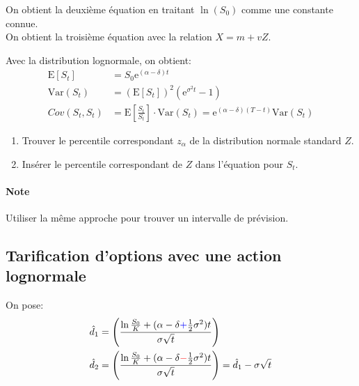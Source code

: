 \documentclass[10pt, french]{article}
\begin{document}
\begin{multicols*}{2}
\begin{definitionNOHFILL}[Distribution]
\tcbline

On obtient la deuxième équation en traitant $\ln(S_{0})$ comme une constante connue.\\
On obtient la troisième équation avec la relation $X = m + vZ$.
\end{definitionNOHFILL}

\begin{definitionNOHFILLsub}
Avec la distribution lognormale, on obtient:
\begin{align*}
	\text{E}[S_{t}]
	&=	S_{0}\textrm{e}^{(\alpha - \delta)t}	\\
	\text{Var}(S_{t})
	&=	\left(\text{E}[S_{t}]\right)^{2} \left(\textrm{e}^{\sigma^{2}t} - 1\right)	\\
	Cov(S_{t}, S_{t})
	&=	\text{E}\left[\frac{S_{t}}{S_{t}}\right] \cdot \text{Var}(S_{t})	
	=	\textrm{e}^{(\alpha - \delta)(T - t)} \text{Var}(S_{t})
\end{align*}
\end{definitionNOHFILLsub}

\begin{distributions}
\begin{enumerate}[leftmargin = *]
	\item	Trouver le percentile correspondant $z_{\alpha}$ de la distribution normale standard $Z$.
	\item	Insérer le percentile correspondant de $Z$ dans l'équation pour $S_{t}$.
\end{enumerate}
\tcbline
\paragraph{Note}	Utiliser la même approche pour trouver un intervalle de prévision.
\end{distributions}

\columnbreak

\subsection*{Tarification d'options avec une action lognormale}

On pose:
\begin{align*}
	\hat{d}_{1}
	&=	\left(
			\frac{\ln\frac{S_{0}}{K} + (\alpha - \delta {\color{blue}+} \frac{1}{2}\sigma^{2})t}
	 			 {\sigma\sqrt{t}}
		\right)	\\
	\hat{d}_{2}
	&=	\left(
			\frac{\ln\frac{S_{0}}{K} + (\alpha - \delta {\color{red}-} \frac{1}{2}\sigma^{2})t}
	 			 {\sigma\sqrt{t}}
		\right)
	=	\hat{d}_{1} - \sigma \sqrt{t}
\end{align*}


\end{multicols*}
\end{document}
